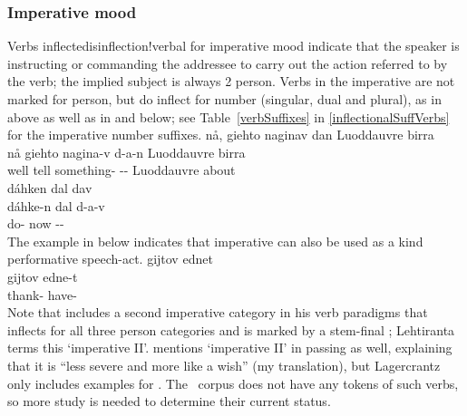 \subsubsection{Imperative mood}\label{IMPmood}
Verbs inflectedis{inflection!verbal} for imperative mood indicate that the speaker is instructing or commanding the addressee to carry out the action referred to by the verb; the implied subject is always 2 person. Verbs in the imperative are not marked for person, but do inflect for number (singular, dual and plural), as in  above as well as in  and  below; see Table~\vref{verbSuffixes} in \SEC\ref{inflectionalSuffVerbs} for the imperative number suffixes. %
\ea\label{imperativeEx1}%
\glll	nå, giehto naginav dan Luoddauvre birra\\
	nå giehto nagina-v d-a-n Luoddauvre birra\\
	well tell\BS{} something- -- Luoddauvre\BS{} about\\\nopagebreak
{}	
\z
\ea\label{imperativeEx2}%
\glll	dáhken dal dav\\
	dáhke-n dal d-a-v\\
	do- now --\\\nopagebreak
{}	
\z
The example in  below indicates that imperative can also be used as a kind performative speech-act. 
\ea\label{imperativeEx3}%
\glll	gijtov ednet\\
	gijtov edne-t\\
	thank- have-\\\nopagebreak
{}	
\z
Note that \citet[150-155]{Lehtiranta1992} includes a second imperative category in his verb paradigms that inflects for all three person categories and is marked by a stem-final ; Lehtiranta terms this ‘imperative II’. \citet[22]{Lagercrantz1926} mentions ‘imperative II’ in passing as well, explaining that it is “less severe and more like a wish” (my translation), but  Lagercrantz only includes examples for \SGs. %
The \PSDP\ corpus does not have any tokens of such verbs, so more study is needed to determine their current status. 


